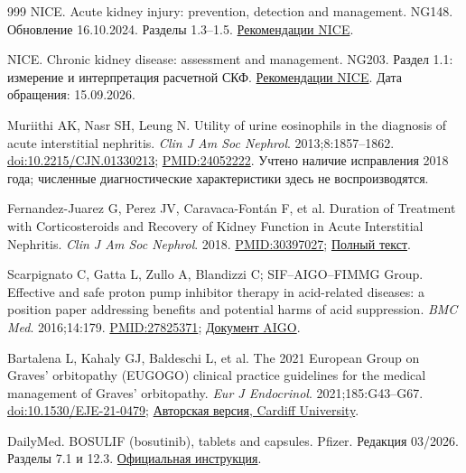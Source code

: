 \documentclass[11pt,a4paper,notitlepage]{report}
\begin{document}
\begin{thebibliography}{999}
 NICE. Acute kidney injury: prevention, detection and management. NG148. Обновление 16.10.2024. Разделы 1.3--1.5. \href{https://www.nice.org.uk/guidance/ng148/chapter/Recommendations}{Рекомендации NICE}.

 NICE. Chronic kidney disease: assessment and management. NG203. Раздел 1.1: измерение и интерпретация расчетной СКФ. \href{https://www.nice.org.uk/guidance/ng203/chapter/Recommendations}{Рекомендации NICE}. Дата обращения: 15.09.2026.

 Muriithi AK, Nasr SH, Leung N. Utility of urine eosinophils in the diagnosis of acute interstitial nephritis. \textit{Clin J Am Soc Nephrol}. 2013;8:1857--1862. \href{https://doi.org/10.2215/CJN.01330213}{doi:10.2215/CJN.01330213}; \href{https://pubmed.ncbi.nlm.nih.gov/24052222/}{PMID:24052222}. Учтено наличие исправления 2018 года; численные диагностические характеристики здесь не воспроизводятся.

 Fernandez-Juarez G, Perez JV, Caravaca-Fontán F, et al. Duration of Treatment with Corticosteroids and Recovery of Kidney Function in Acute Interstitial Nephritis. \textit{Clin J Am Soc Nephrol}. 2018. \href{https://pubmed.ncbi.nlm.nih.gov/30397027/}{PMID:30397027}; \href{https://pmc.ncbi.nlm.nih.gov/articles/PMC6302327/}{Полный текст}.

 Scarpignato C, Gatta L, Zullo A, Blandizzi C; SIF--AIGO--FIMMG Group. Effective and safe proton pump inhibitor therapy in acid-related diseases: a position paper addressing benefits and potential harms of acid suppression. \textit{BMC Med}. 2016;14:179. \href{https://pubmed.ncbi.nlm.nih.gov/27825371/}{PMID:27825371}; \href{https://www.webaigo.it/download/20180807092918.pdf}{Документ AIGO}.

 Bartalena L, Kahaly GJ, Baldeschi L, et al. The 2021 European Group on Graves' orbitopathy (EUGOGO) clinical practice guidelines for the medical management of Graves' orbitopathy. \textit{Eur J Endocrinol}. 2021;185:G43--G67. \href{https://doi.org/10.1530/EJE-21-0479}{doi:10.1530/EJE-21-0479}; \href{https://orca.cardiff.ac.uk/id/eprint/143526/1/eje-21-0479.pdf}{Авторская версия, Cardiff University}.

 DailyMed. BOSULIF (bosutinib), tablets and capsules. Pfizer. Редакция 03/2026. Разделы 7.1 и 12.3. \href{https://dailymed.nlm.nih.gov/dailymed/lookup.cfm?setid=adc84ad5-a04d-4fee-9ba8-91f7abd928e3}{Официальная инструкция}.


\end{thebibliography}
\end{document}
